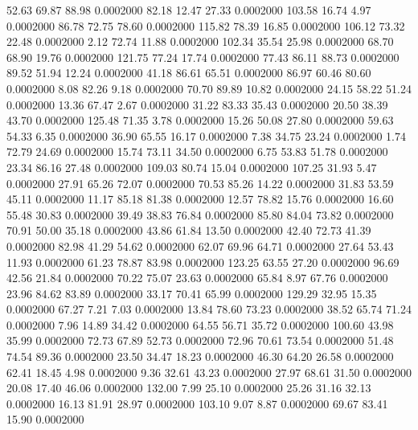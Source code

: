   52.63   69.87   88.98   0.0002000
  82.18   12.47   27.33   0.0002000
 103.58   16.74    4.97   0.0002000
  86.78   72.75   78.60   0.0002000
 115.82   78.39   16.85   0.0002000
 106.12   73.32   22.48   0.0002000
   2.12   72.74   11.88   0.0002000
 102.34   35.54   25.98   0.0002000
  68.70   68.90   19.76   0.0002000
 121.75   77.24   17.74   0.0002000
  77.43   86.11   88.73   0.0002000
  89.52   51.94   12.24   0.0002000
  41.18   86.61   65.51   0.0002000
  86.97   60.46   80.60   0.0002000
   8.08   82.26    9.18   0.0002000
  70.70   89.89   10.82   0.0002000
  24.15   58.22   51.24   0.0002000
  13.36   67.47    2.67   0.0002000
  31.22   83.33   35.43   0.0002000
  20.50   38.39   43.70   0.0002000
 125.48   71.35    3.78   0.0002000
  15.26   50.08   27.80   0.0002000
  59.63   54.33    6.35   0.0002000
  36.90   65.55   16.17   0.0002000
   7.38   34.75   23.24   0.0002000
   1.74   72.79   24.69   0.0002000
  15.74   73.11   34.50   0.0002000
   6.75   53.83   51.78   0.0002000
  23.34   86.16   27.48   0.0002000
 109.03   80.74   15.04   0.0002000
 107.25   31.93    5.47   0.0002000
  27.91   65.26   72.07   0.0002000
  70.53   85.26   14.22   0.0002000
  31.83   53.59   45.11   0.0002000
  11.17   85.18   81.38   0.0002000
  12.57   78.82   15.76   0.0002000
  16.60   55.48   30.83   0.0002000
  39.49   38.83   76.84   0.0002000
  85.80   84.04   73.82   0.0002000
  70.91   50.00   35.18   0.0002000
  43.86   61.84   13.50   0.0002000
  42.40   72.73   41.39   0.0002000
  82.98   41.29   54.62   0.0002000
  62.07   69.96   64.71   0.0002000
  27.64   53.43   11.93   0.0002000
  61.23   78.87   83.98   0.0002000
 123.25   63.55   27.20   0.0002000
  96.69   42.56   21.84   0.0002000
  70.22   75.07   23.63   0.0002000
  65.84    8.97   67.76   0.0002000
  23.96   84.62   83.89   0.0002000
  33.17   70.41   65.99   0.0002000
 129.29   32.95   15.35   0.0002000
  67.27    7.21    7.03   0.0002000
  13.84   78.60   73.23   0.0002000
  38.52   65.74   71.24   0.0002000
   7.96   14.89   34.42   0.0002000
  64.55   56.71   35.72   0.0002000
 100.60   43.98   35.99   0.0002000
  72.73   67.89   52.73   0.0002000
  72.96   70.61   73.54   0.0002000
  51.48   74.54   89.36   0.0002000
  23.50   34.47   18.23   0.0002000
  46.30   64.20   26.58   0.0002000
  62.41   18.45    4.98   0.0002000
   9.36   32.61   43.23   0.0002000
  27.97   68.61   31.50   0.0002000
  20.08   17.40   46.06   0.0002000
 132.00    7.99   25.10   0.0002000
  25.26   31.16   32.13   0.0002000
  16.13   81.91   28.97   0.0002000
 103.10    9.07    8.87   0.0002000
  69.67   83.41   15.90   0.0002000
